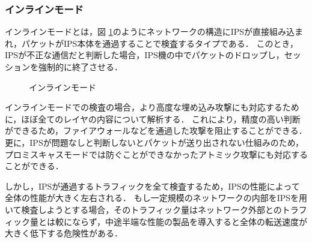\subsubsection{インラインモード}

インラインモードとは，図 \ref{fig:2-2}のようにネットワークの構造にIPSが直接組み込まれ，パケットがIPS本体を通過することで検査するタイプである\cite{ciscoips}．
このとき，IPSが不正な通信だと判断した場合，IPS機の中でパケットのドロップし，セッションを強制的に終了させる．

\begin{figure}[tb]
	\begin{center}
		\caption{インラインモード}
		\label{fig:2-2}
	\end{center}
\end{figure}

インラインモードでの検査の場合，より高度な埋め込み攻撃にも対応するために，ほぼ全てのレイヤの内容について解析する．
これにより，精度の高い判断ができるため，ファイアウォールなどを通過した攻撃を阻止することができる．
更に，IPSが問題なしと判断しないとパケットが送り出されない仕組みのため，プロミスキャスモードでは防ぐことができなかったアトミック攻撃にも対応することができる．

しかし，IPSが通過するトラフィックを全て検査するため，IPSの性能によって全体の性能が大きく左右される．
もし一定規模のネットワークの内部をIPSを用いて検査しようとする場合，そのトラフィック量はネットワーク外部とのトラフィック量とは較にならず，中途半端な性能の製品を導入すると全体の転送速度が大きく低下する危険性がある．